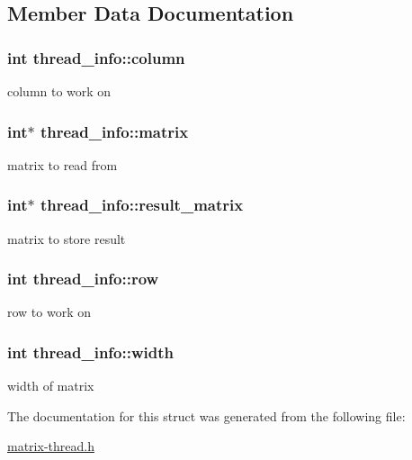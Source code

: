 \subsection{Member Data Documentation}
\hypertarget{structthread__info_a23730021e335c8434442f6c08c39d5d3}{
\subsubsection[{column}]{\setlength{\rightskip}{0pt plus 5cm}int thread\-\_\-info\-::column}}\label{structthread__info_a23730021e335c8434442f6c08c39d5d3}
column to work on \hypertarget{structthread__info_a86d6bf42442a6d69385654fe4f6ede4e}{
\subsubsection[{matrix}]{\setlength{\rightskip}{0pt plus 5cm}int$\ast$ thread\-\_\-info\-::matrix}}\label{structthread__info_a86d6bf42442a6d69385654fe4f6ede4e}
matrix to read from \hypertarget{structthread__info_a65c42fcdb0d5c06839e4bec9582cc4a0}{
\subsubsection[{result\-\_\-matrix}]{\setlength{\rightskip}{0pt plus 5cm}int$\ast$ thread\-\_\-info\-::result\-\_\-matrix}}\label{structthread__info_a65c42fcdb0d5c06839e4bec9582cc4a0}
matrix to store result \hypertarget{structthread__info_a0fb23597b4babe618d9fc5a44f15a110}{
\subsubsection[{row}]{\setlength{\rightskip}{0pt plus 5cm}int thread\-\_\-info\-::row}}\label{structthread__info_a0fb23597b4babe618d9fc5a44f15a110}
row to work on \hypertarget{structthread__info_af708cf019e6b4d58a30b4519d8c31e65}{
\subsubsection[{width}]{\setlength{\rightskip}{0pt plus 5cm}int thread\-\_\-info\-::width}}\label{structthread__info_af708cf019e6b4d58a30b4519d8c31e65}
width of matrix 

The documentation for this struct was generated from the following file\-:\begin{DoxyCompactItemize}
\item 
\hyperlink{matrix-thread_8h}{matrix-\/thread.\-h}\end{DoxyCompactItemize}
